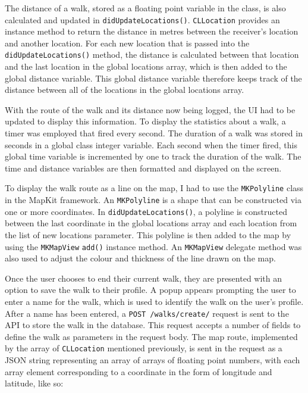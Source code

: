 The distance of a walk, stored as a floating point variable in the class, is also calculated and updated in \verb|didUpdateLocations()|. \verb|CLLocation| provides an instance method to return the distance in metres between the receiver's location and another location. For each new location that is passed into the \verb|didUpdateLocations()| method, the distance is calculated between that location and the last location in the global locations array, which is then added to the global distance variable. This global distance variable therefore keeps track of the distance between all of the locations in the global locations array.

With the route of the walk and its distance now being logged, the UI had to be updated to display this information. To display the statistics about a walk, a timer was employed that fired every second. The duration of a walk was stored in seconds in a global class integer variable. Each second when the timer fired, this global time variable is incremented by one to track the duration of the walk. The time and distance variables are then formatted and displayed on the screen.

To display the walk route as a line on the map, I had to use the \verb|MKPolyline| class in the MapKit framework. An \verb|MKPolyline| is a shape that can be constructed via one or more coordinates. In \verb|didUpdateLocations()|, a polyline is constructed between the last coordinate in the global locations array and each location from the list of new locations parameter. This polyline is then added to the map by using the \verb|MKMapView| \verb|add()| instance method. An \verb|MKMapView| delegate method was also used to adjust the colour and thickness of the line drawn on the map.


Once the user chooses to end their current walk, they are presented with an option to save the walk to their profile. A popup appears prompting the user to enter a name for the walk, which is used to identify the walk on the user's profile. After a name has been entered, a \verb|POST /walks/create/| request is sent to the API to store the walk in the database. This request accepts a number of fields to define the walk as parameters in the request body. The map route, implemented by the array of \verb|CLLocation| mentioned previously, is sent in the request as a JSON string representing an array of arrays of floating point numbers, with each array element corresponding to a coordinate in the form of longitude and latitude, like so:

